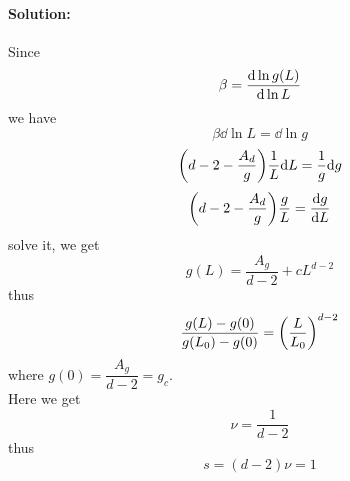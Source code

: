 \documentclass[a4paper]{article}
\numberwithin{equation}{section}
\begin{document}
\paragraph{Solution:}
Since
\begin{equation}\label{key}
\beta = \dv{\ln g(L)}{\ln L}
\end{equation}
we have
\begin{equation}\label{key}
 \beta \dd\ln L =  \dd \ln g
\end{equation}
\begin{equation}\label{key}
 \qty(d - 2 - \dfrac{A_d}{g}) \dfrac{1}{L}\dd L = \dfrac{1}{g}\dd  g
\end{equation}
\begin{equation}\label{key}
\qty(d - 2 - \dfrac{A_d}{g}) \dfrac{g}{L} = \dv{g}{L}
\end{equation}
solve it, we get
\begin{equation}\label{key}
g(L) = \dfrac{A_g}{d - 2} + c L^{d-2}
\end{equation}
thus
\begin{equation}\label{key}
\dfrac{g(L) - g(0)}{g(L_0) - g(0)} = \qty(\dfrac{L}{L_0})^{d-2}
\end{equation}
where $ g(0) = \dfrac{A_g}{d-2} = g_c $.\\
Here we get 
\begin{equation}\label{key}
 \nu = \dfrac{1}{d-2} 
\end{equation}
thus
\begin{equation}\label{key}
s = (d-2)\nu = 1
\end{equation}



\end{document}
